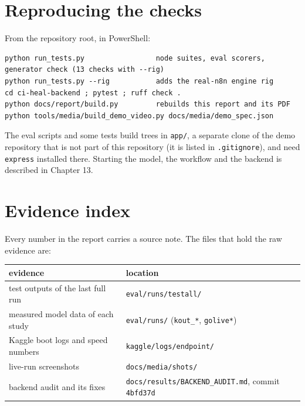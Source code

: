 \documentclass[11pt,a4paper]{report}
\begin{document}
\section{Reproducing the checks}

From the repository root, in PowerShell:

\begin{lstlisting}
python run_tests.py                 node suites, eval scorers, generator check (13 checks with --rig)
python run_tests.py --rig           adds the real-n8n engine rig
cd ci-heal-backend ; pytest ; ruff check .
python docs/report/build.py         rebuilds this report and its PDF
python tools/media/build_demo_video.py docs/media/demo_spec.json
\end{lstlisting}

The eval scripts and some tests build trees in \texttt{app/\allowbreak{}}, a separate clone of the demo repository that is not part of this repository (it is listed in \texttt{.\allowbreak{}gitignore}), and need \texttt{express} installed there. Starting the model, the workflow and the backend is described in Chapter 13.

\section{Evidence index}

Every number in the report carries a source note. The files that hold the raw evidence are:

\begin{longtable}{>{\raggedright\arraybackslash}p{0.410\dimexpr\linewidth-4\tabcolsep\relax}>{\raggedright\arraybackslash}p{0.590\dimexpr\linewidth-4\tabcolsep\relax}}
\toprule
\textbf{evidence} & \textbf{location} \\
\midrule
\endhead
test outputs of the last full run & \texttt{eval/\allowbreak{}runs/\allowbreak{}testall/\allowbreak{}} \\
measured model data of each study & \texttt{eval/\allowbreak{}runs/\allowbreak{}} (\texttt{kout\_\allowbreak{}*}, \texttt{golive*}) \\
Kaggle boot logs and speed numbers & \texttt{kaggle/\allowbreak{}logs/\allowbreak{}endpoint/\allowbreak{}} \\
live-run screenshots & \texttt{docs/\allowbreak{}media/\allowbreak{}shots/\allowbreak{}} \\
backend audit and its fixes & \texttt{docs/\allowbreak{}results/\allowbreak{}BACKEND\_\allowbreak{}AUDIT.\allowbreak{}md}, commit \texttt{4bfd37d} \\
\bottomrule
\end{longtable}
\end{document}
